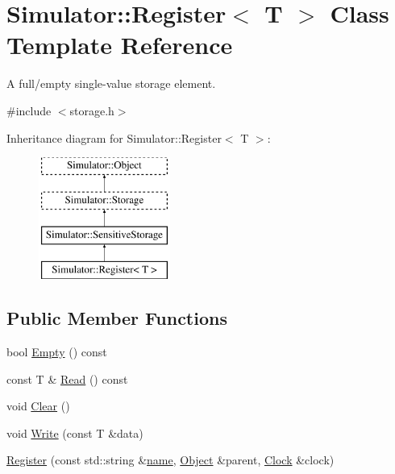 \hypertarget{class_simulator_1_1_register}{\section{Simulator\+:\+:Register$<$ T $>$ Class Template Reference}
\label{class_simulator_1_1_register}
}


A full/empty single-\/value storage element.  




{\ttfamily \#include $<$storage.\+h$>$}

Inheritance diagram for Simulator\+:\+:Register$<$ T $>$\+:\begin{figure}[H]
\begin{center}
\leavevmode
\includegraphics[height=4.000000cm]{class_simulator_1_1_register}
\end{center}
\end{figure}
\subsection*{Public Member Functions}
\begin{DoxyCompactItemize}
\item 
bool \hyperlink{class_simulator_1_1_register_a2cb4753bc848ec69efea17d036720770}{Empty} () const 
\item 
const T \& \hyperlink{class_simulator_1_1_register_aad2dabfe1089f856726008a2526dfc75}{Read} () const 
\item 
void \hyperlink{class_simulator_1_1_register_a96aef64305b2ce4d726aa2c12cf07b41}{Clear} ()
\item 
void \hyperlink{class_simulator_1_1_register_af29086329d3bf6c4359415dc7150176d}{Write} (const T \&data)
\item 
\hyperlink{class_simulator_1_1_register_a48c519ec6f3b3176f6dfb80cdb2085cc}{Register} (const std\+::string \&\hyperlink{mtconf_8c_a8f8f80d37794cde9472343e4487ba3eb}{name}, \hyperlink{class_simulator_1_1_object}{Object} \&parent, \hyperlink{class_simulator_1_1_clock}{Clock} \&clock)
\end{DoxyCompactItemize}
